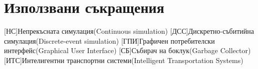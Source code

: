 \appendix
\chapter{Използвани съкращения}
	\begin{acronym}[JDK]
		[НС]{Непрекъсната симулация(Continuous simulation)}
		[ДСС]{Дискретно-събитийна симулация(Discrete-event simulation)}
		[ГПИ]{Графичен потребителски интерфейс(Graphical User Interface)}
		[СБ]{Събирач на боклук(Garbage Collector)}
		[ИТС]{Интелигентни транспортни системи(Intelligent Transportation Systems)}
	\end{acronym}